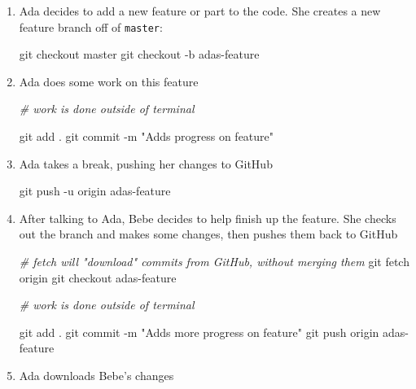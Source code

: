 \documentclass[]{book}
\newenvironment{Shaded}{\begin{snugshade}}{\end{snugshade}}
\newcommand{\StringTok}[1]{\textcolor[rgb]{0.31,0.60,0.02}{#1}}
\newcommand{\CommentTok}[1]{\textcolor[rgb]{0.56,0.35,0.01}{\textit{#1}}}
\newcommand{\FunctionTok}[1]{\textcolor[rgb]{0.00,0.00,0.00}{#1}}
\newcommand{\NormalTok}[1]{#1}
\theoremstyle{definition}
\theoremstyle{definition}
\theoremstyle{remark}
\begin{document}
\begin{enumerate}
\def\labelenumi{\arabic{enumi}.}
\item
  Ada decides to add a new feature or part to the code. She creates a
  new feature branch off of \texttt{master}:

\begin{Shaded}
\begin{Highlighting}[]
\FunctionTok{git}\NormalTok{ checkout master}
\FunctionTok{git}\NormalTok{ checkout -b adas-feature}
\end{Highlighting}
\end{Shaded}
\item
  Ada does some work on this feature

\begin{Shaded}
\begin{Highlighting}[]
\CommentTok{# work is done outside of terminal}

\FunctionTok{git}\NormalTok{ add .}
\FunctionTok{git}\NormalTok{ commit -m }\StringTok{"Adds progress on feature"}
\end{Highlighting}
\end{Shaded}
\item
  Ada takes a break, pushing her changes to GitHub

\begin{Shaded}
\begin{Highlighting}[]
\FunctionTok{git}\NormalTok{ push -u origin adas-feature}
\end{Highlighting}
\end{Shaded}
\item
  After talking to Ada, Bebe decides to help finish up the feature. She
  checks out the branch and makes some changes, then pushes them back to
  GitHub

\begin{Shaded}
\begin{Highlighting}[]
\CommentTok{# fetch will "download" commits from GitHub, without merging them}
\FunctionTok{git}\NormalTok{ fetch origin}
\FunctionTok{git}\NormalTok{ checkout adas-feature}

\CommentTok{# work is done outside of terminal}

\FunctionTok{git}\NormalTok{ add .}
\FunctionTok{git}\NormalTok{ commit -m }\StringTok{"Adds more progress on feature"}
\FunctionTok{git}\NormalTok{ push origin adas-feature}
\end{Highlighting}
\end{Shaded}
\item
  Ada downloads Bebe's changes


\end{enumerate}
\end{document}
